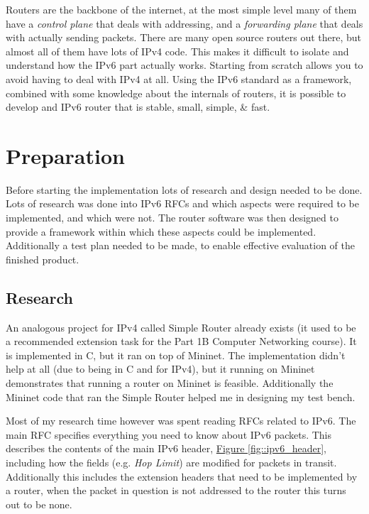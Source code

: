 \documentclass[12pt,a4paper,twoside,openright]{report}
\begin{document}
\bigskip

Routers are the backbone of the internet, at the most simple level many of them have a \textit{control plane} that deals with addressing, and a \textit{forwarding plane} that deals with actually sending packets. There are many open source routers out there, but almost all of them have lots of IPv4 code. This makes it difficult to isolate and understand how the IPv6 part actually works.  Starting from scratch allows you to avoid having to deal with IPv4 at all.  Using the IPv6 standard as a framework, combined with some knowledge about the internals of routers, it is possible to develop and IPv6 router that is stable, small, simple, \& fast.

\chapter{Preparation}

Before starting the implementation lots of research and design needed to be done. Lots of research was done into IPv6 RFCs and which aspects were required to be implemented, and which were not. The router software was then designed to provide a framework within which these aspects could be implemented.  Additionally a test plan needed to be made, to enable effective evaluation of the finished product.

\section{Research}
An analogous project for IPv4 called Simple Router already exists\cite{simple_router} (it used to be a recommended extension task for the Part 1B Computer Networking course).  It is implemented in C, but it ran on top of Mininet.  The implementation didn't help at all (due to being in C and for IPv4), but it running on Mininet demonstrates that running a router on Mininet is feasible.  Additionally the Mininet code that ran the Simple Router helped me in designing my test bench.

\bigskip

Most of my research time however was spent reading RFCs related to IPv6.  The main RFC\cite{ipv6_rfc} specifies everything you need to know about IPv6 packets. This describes the contents of the main IPv6 header, \hyperref[fig::ipv6_header]{Figure }\ref{fig::ipv6_header}, including how the fields (e.g. \textit{Hop Limit}) are modified for packets in transit. Additionally this includes the extension headers that need to be implemented by a router, when the packet in question is not addressed to the router this turns out to be none. 
\end{document}
